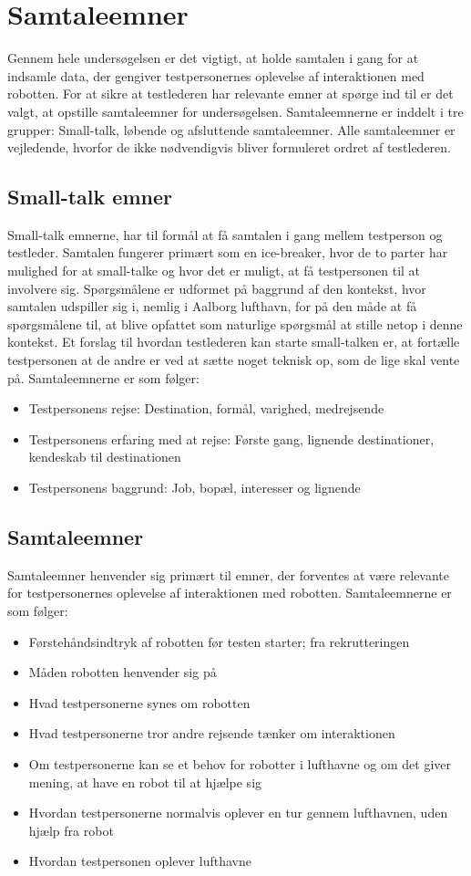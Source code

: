\section{Samtaleemner}
\label{ParametreSamtaleemner}
%
Gennem hele undersøgelsen er det vigtigt, at holde samtalen i gang for at indsamle data, der gengiver testpersonernes oplevelse af interaktionen med robotten. For at sikre at testlederen har relevante emner at spørge ind til er det valgt, at opstille samtaleemner for undersøgelsen. Samtaleemnerne er inddelt i tre grupper: Small-talk, løbende og afsluttende samtaleemner. Alle samtaleemner er vejledende, hvorfor de ikke nødvendigvis bliver formuleret ordret af testlederen.

\subsection{Small-talk emner} 
\label{ParametreISmallTalk}
%
Small-talk emnerne, har til formål at få samtalen i gang mellem testperson og testleder. Samtalen fungerer primært som en ice-breaker, hvor de to parter har mulighed for at small-talke og hvor det er muligt, at få testpersonen til at involvere sig. Spørgsmålene er udformet på baggrund af den kontekst, hvor samtalen udspiller sig i, nemlig i Aalborg lufthavn, for på den måde at få spørgsmålene til, at blive opfattet som naturlige spørgsmål at stille netop i denne kontekst. Et forslag til hvordan testlederen kan starte small-talken er, at fortælle testpersonen at de andre er ved at sætte noget teknisk op, som de lige skal vente på. Samtaleemnerne er som følger:\blankline
%
\begin{itemize}
\item Testpersonens rejse: Destination, formål, varighed, medrejsende
\item Testpersonens erfaring med at rejse: Første gang, lignende destinationer, kendeskab til destinationen 
\item Testpersonens baggrund: Job, bopæl, interesser og lignende
\end{itemize}
%
\subsection{Samtaleemner} 
\label{ParametreSamtaleemner}
%
Samtaleemner henvender sig primært til emner, der forventes at være relevante for testpersonernes oplevelse af interaktionen med robotten. Samtaleemnerne er som følger:\blankline
%
\begin{itemize}
\item Førstehåndsindtryk af robotten før testen starter; fra rekrutteringen
\item Måden robotten henvender sig på
\item Hvad testpersonerne synes om robotten
\item Hvad testpersonerne tror andre rejsende tænker om interaktionen 
\item Om testpersonerne kan se et behov for robotter i lufthavne og om det giver mening, at have en robot til at hjælpe sig
\item Hvordan testpersonerne normalvis oplever en tur gennem lufthavnen, uden hjælp fra robot
\item Hvordan testpersonen oplever lufthavne 
\end{itemize}
%
